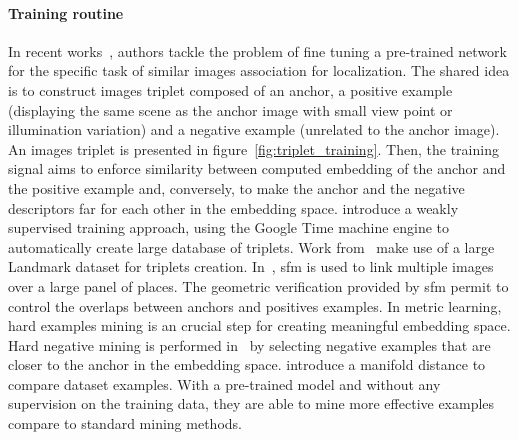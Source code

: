 
\paragraph{Training routine}
In recent works~\citep{Arandjelovic2017,Radenovic2016, Gordo2016}, authors tackle the problem of fine tuning a pre-trained network for the specific task of similar images association for localization. The shared idea is to construct images triplet composed of an anchor, a positive example (displaying the same scene as the anchor image with small view point or illumination variation) and a negative example (unrelated to the anchor image). An images triplet is presented in figure~\ref{fig:triplet_training}. Then, the training signal aims to enforce similarity between computed embedding of the anchor and the positive example and, conversely, to make the anchor and the negative descriptors far for each other in the embedding space. \citet{Arandjelovic2017} introduce a weakly supervised training approach, using the Google Time machine engine to automatically create large database of triplets. Work from~\citep{Gordo2017,Noh2017} make use of a large Landmark dataset for triplets creation. In~\citep{Radenovic2016,Radenovic2017}, \ac{sfm} is used to link multiple images over a large panel of places. The geometric verification provided by \ac{sfm} permit to control the overlaps between anchors and positives examples. In metric learning, hard examples mining is an crucial step for creating meaningful embedding space. Hard negative mining is performed in~\citep{Arandjelovic2017,Radenovic2017,Gordo2016} by selecting negative examples that are closer to the anchor in the embedding space. \citet{Iscen2018} introduce a manifold distance to compare dataset examples. With a pre-trained model and without any supervision on the training data, they are able to mine more effective examples compare to standard mining methods.

